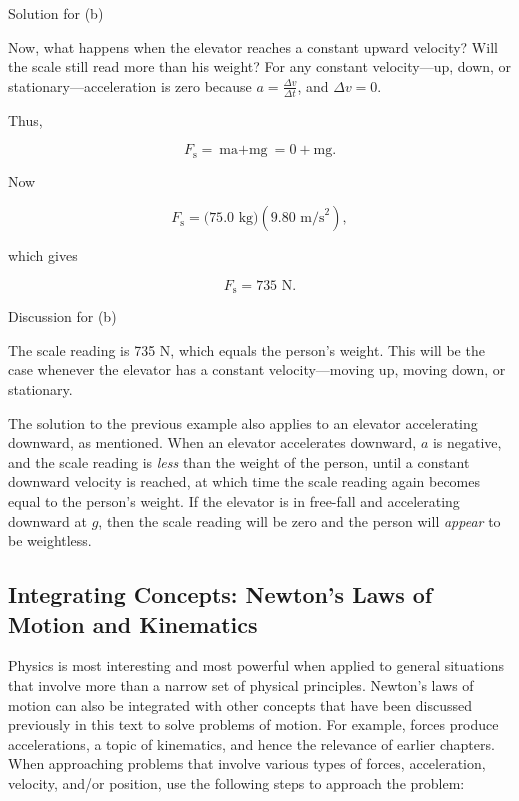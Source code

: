 \documentclass[
]{book}
\begin{document}
{Solution for (b)}

Now, what happens when the elevator reaches a constant upward velocity?
Will the scale still read more than his weight? For any constant
velocity---up, down, or stationary---acceleration is zero because
\({a = \frac{\Delta v}{\Delta t}}{}\), and \({\Delta v = 0}{}\).

Thus,

\leavevmode{}%
\[{{F_{\text{s}} = {\text{ma} + \text{mg}}} = {0 + \text{mg}}}.\]

Now

\leavevmode{}%
\[{{F_{\text{s}} = (}\text{75}\text{.}\text{0\ kg})(9\text{.}\text{80\ m/s}^{2})},\]

which gives

\leavevmode{}%
\[{{F_{\text{s}} = 7}\text{35\ N}}.\]

{Discussion for (b)}

The scale reading is 735 N, which equals the person's weight. This will
be the case whenever the elevator has a constant velocity---moving up,
moving down, or stationary.

The solution to the previous example also applies to an elevator
accelerating downward, as mentioned. When an elevator accelerates
downward, \(a{}\) is negative, and the scale reading is \emph{less} than the
weight of the person, until a constant downward velocity is reached, at
which time the scale reading again becomes equal to the person's weight.
If the elevator is in free-fall and accelerating downward at \(g{}\), then
the scale reading will be zero and the person will \emph{appear} to be
weightless.

\hypertarget{fs-id1517458}{}
\hypertarget{integrating-concepts-newtons-laws-of-motion-and-kinematics}{%
\subsection{Integrating Concepts: Newton's Laws of Motion and Kinematics}\label{integrating-concepts-newtons-laws-of-motion-and-kinematics}}

Physics is most interesting and most powerful when applied to general
situations that involve more than a narrow set of physical principles.
Newton's laws of motion can also be integrated with other concepts that
have been discussed previously in this text to solve problems of motion.
For example, forces produce accelerations, a topic of kinematics, and
hence the relevance of earlier chapters. When approaching problems that
involve various types of forces, acceleration, velocity, and/or
position, use the following steps to approach the problem:
\end{document}
